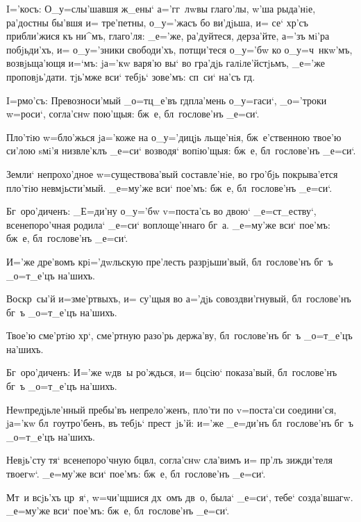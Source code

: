 I='косъ: О_у=слы'шавшя ж_ены` а='гг~лwвы глаго'лы, 
w'ша рыда'нiе, ра'достны бы'вшя и= тре'петны, 
о_у='жасъ бо ви'дjьша, и= се` хр'съ прибли'жися къ 
ни^мъ, глаго'ля: _е='же, ра'дуйтеся, дерза'йте, а='зъ 
мi'ра побjьди'хъ, и= о_у='зники свободи'хъ, потщи'теся 
о_у='бw ко о_у=ч~нкw'мъ, возвjьща'ющя и=`мъ: jа='кw 
варя'ю вы` во гра'дjь галiле'йстjьмъ, _е='же 
проповjь'дати. тjь'мже вси` тебjь` зове'мъ: сп~си` на'съ 
гд.


I=рмо'съ: Превозноси'мый _о=тц_е'въ гд пла'мень 
о_у=гаси`, _о='троки w=роси`, согла'снw пою'щыя: бж~е, 
бл~гослове'нъ _е=си`.

Пло'тiю w=бло'жься jа='коже на о_у='дицjь льще'нiя, 
бж~е'ственною твое'ю си'лою sмi'я низвле'клъ _е=си` 
возводя` вопiю'щыя: бж~е, бл~гослове'нъ _е=си`.

Земли` непрохо'дное w=существова'вый составле'нiе, во 
гро'бjь покрыва'ется пло'тiю невмjьсти'мый. _е=му'же вси` 
пое'мъ: бж~е, бл~гослове'нъ _е=си`.

Бг~оро'диченъ: _Е=ди'ну о_у='бw v=поста'сь во двою` 
_е=ст_еству`, всенепоро'чная родила` _е=си` воплоще'ннаго 
бг~а. _е=му'же вси` пое'мъ: бж~е, бл~гослове'нъ _е=си`.


И='же дре'вомъ кр i='дwльскую пре'лесть 
разрjьши'вый, бл~гослове'нъ бг~ъ _о=т_е'цъ на'шихъ.

Воскр~сы'й и=з\ъ ме'ртвыхъ, и= су'щыя во а='дjь 
совоздви'гнувый, бл~гослове'нъ бг~ъ _о=т_е'цъ на'шихъ. 

Твое'ю сме'ртiю хр`, сме'ртную разо'рь держа'ву, 
бл~гослове'нъ бг~ъ _о=т_е'цъ на'шихъ.

Бг~оро'диченъ: И='же w\т дв~ы ро'ждься, и= бц сiю` 
показа'вый, бл~гослове'нъ бг~ъ _о=т_е'цъ на'шихъ. 


Неwпредjьле'нный пребы'въ непрело'женъ, пло'ти по 
v=поста'си соедини'ся, jа='кw бл~гоутро'бенъ, въ тебjь` 
прест~jь'й: и='же _е=ди'нъ бл~гослове'нъ бг~ъ _о=т_е'цъ 
на'шихъ.

Невjь'сту тя` всенепоро'чную бц вл, согла'снw 
сла'вимъ и= пр'лъ зижди'теля твоегw`. _е=му'же вси` 
пое'мъ: бж~е, бл~гослове'нъ _е=си`.

Мт~и всjь'хъ цр~я`, w=чи'щшися дх~омъ дв~о, была` 
_е=си`, тебе` созда'вшагw. _е=му'же вси` пое'мъ: бж~е, 
бл~гослове'нъ _е=си`.

